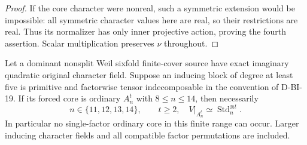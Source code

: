\begin{proof}
If the core character were nonreal, such a symmetric extension
would be impossible: all symmetric character values here are
real, so their restrictions are real.  Thus its normalizer
has only inner projective action, proving the fourth assertion.
Scalar multiplication preserves $\nu$ throughout.
\end{proof}

\begin{theorem}
\label{HD-ALT-02b}
Let a dominant nonsplit Weil sixfold finite-cover source have exact
imaginary quadratic original character field.  Suppose an inducing
block of degree at least five is primitive and factorwise tensor
indecomposable in the convention of D-BI-19.  If its forced core
is ordinary $A_n^t$ with $8\le n\le14$, then necessarily
\[
 n\in\{11,12,13,14\},\qquad t\ge2,
 \quad V|_{A_n^t}\simeq\operatorname{Std}_n^{\otimes t}.
                                                               \tag{ALTS.1}
\]
In particular no single-factor ordinary core in this finite range
can occur.  Larger inducing character fields and all compatible
factor permutations are included.
\end{theorem}

